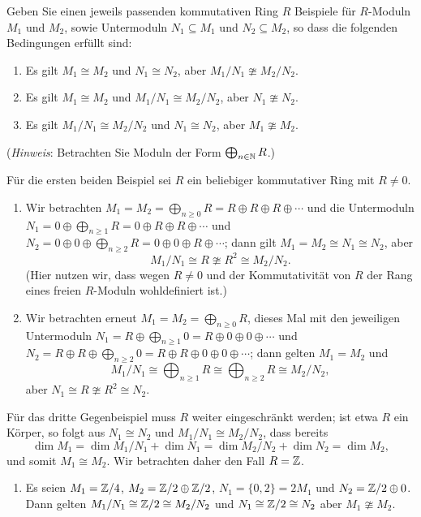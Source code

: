 \begin{question}[subtitle = Kürzungsregeln bis auf Isomorphie]
  \label{question: cancelation laws up to isomorphism}
  Geben Sie einen jeweils passenden kommutativen Ring $R$ Beispiele für $R$-Moduln $M_1$ und $M_2$, sowie Untermoduln $N_1 \subseteq M_1$ und $N_2 \subseteq M_2$, so dass die folgenden Bedingungen erfüllt sind:
  \begin{enumerate}
    \item
      Es gilt $M_1 \cong M_2$ und $N_1 \cong N_2$, aber $M_1/N_1 \ncong M_2/N_2$.
    \item
      Es gilt $M_1 \cong M_2$ und $M_1/N_1 \cong M_2/N_2$, aber $N_1 \ncong N_2$.
    \item
      Es gilt $M_1/N_1 \cong M_2/N_2$ und $N_1 \cong N_2$, aber $M_1 \ncong M_2$.
  \end{enumerate}
  (\emph{Hinweis}:
   Betrachten Sie Moduln der Form $\bigoplus_{n \in \mathbb{N}} R$.)
\end{question}


\begin{solution}
  Für die ersten beiden Beispiel sei $R$ ein beliebiger kommutativer Ring mit $R \neq 0$.
  \begin{enumerate}
    \item
      Wir betrachten $M_1 = M_2 = \bigoplus_{n \geq 0} R = R \oplus R \oplus R \oplus \dotsb$ und die Untermoduln $N_1 = 0 \oplus \bigoplus_{n \geq 1} R = 0 \oplus R \oplus R \oplus \dotsb$ und $N_2 = 0 \oplus 0 \oplus \bigoplus_{n \geq 2} R = 0 \oplus 0 \oplus R \oplus \dotsb$;
      dann gilt $M_1 = M_2 \cong N_1 \cong N_2$, aber
      \[
        M_1/N_1 \cong R \ncong R^2 \cong M_2/N_2.
      \]
      (Hier nutzen wir, dass wegen $R \neq 0$ und der Kommutativität von $R$ der Rang eines freien $R$-Moduln wohldefiniert ist.)
    
    \item
      Wir betrachten erneut $M_1 = M_2 = \bigoplus_{n \geq 0} R$, dieses Mal mit den jeweiligen Untermoduln $N_1 = R \oplus \bigoplus_{n \geq 1} 0 = R \oplus 0 \oplus 0 \oplus \dotsb$ und $N_2 = R \oplus R \oplus \bigoplus_{n \geq 2} 0 = R \oplus R \oplus 0 \oplus 0 \oplus \dotsb$;
      dann gelten $M_1 = M_2$ und
      \[
              M_1/N_1
        \cong \bigoplus_{n \geq 1} R
        \cong \bigoplus_{n \geq 2} R
        \cong M_2/N_2,
      \]
      aber $N_1 \cong R \ncong R^2 \cong N_2$.
  \end{enumerate}
  Für das dritte Gegenbeispiel muss $R$ weiter eingeschränkt werden;
  ist etwa $R$ ein Körper, so folgt aus $N_1 \cong N_2$ und $M_1/N_1 \cong M_2/N_2$, dass bereits
  \[
    \dim M_1 = \dim M_1/N_1 + \dim N_1 = \dim M_2/N_2 + \dim N_2 = \dim M_2,
  \]
  und somit $M_1 \cong M_2$.
  Wir betrachten daher den Fall $R = \mathbb{Z}$.
  \begin{enumerate}[resume]
    \item
      Es seien $M_1 = \mathbb{Z}/4$, $M_2 = \mathbb{Z}/2 \oplus \mathbb{Z}/2$, $N_1 = \{0,2\} = 2 M_1$ und $N_2 = \mathbb{Z}/2 \oplus 0$.
      Dann gelten $M_1/N_1 \cong \mathbb{Z}/2 \cong M_2/N_2$ und $N_1 \cong \mathbb{Z}/2 \cong N_2$ aber $M_1 \ncong M_2$.
  \end{enumerate}
\end{solution}


